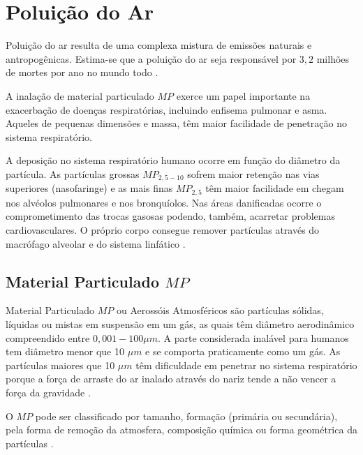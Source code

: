 \section{Poluição do Ar}

Poluição do ar resulta de uma complexa mistura de emissões naturais e 
antropogênicas. Estima-se que a poluição do ar seja responsável por 
$3,2$ milhões de mortes por ano no mundo todo \citep{lim2013}.%

A inalação de material particulado $MP$ exerce um papel importante na 
exacerbação de doenças respiratórias, incluindo enfisema pulmonar e asma. 
Aqueles de pequenas dimensões e massa, têm maior facilidade de penetração no sistema 
respiratório. 

A deposição no sistema respiratório humano ocorre em função do diâmetro da 
partícula.
As partículas grossas $MP_{2,5-10}$ sofrem maior retenção nas vias superiores (nasofaringe) e
as mais finas $MP_{2,5}$ têm maior facilidade em chegam nos alvéolos pulmonares e 
nos bronquíolos.
Nas áreas danificadas ocorre o comprometimento das trocas gasosas podendo, 
também, acarretar problemas cardiovasculares.
O próprio corpo consegue remover partículas através do macrófago alveolar 
e do sistema linfático \citep{arbex2012}.


\subsection{Material Particulado $MP$}

Material Particulado $MP$ ou Aerossóis Atmosféricos são partículas
sólidas, líquidas ou mistas em suspensão em um gás, as quais têm diâmetro 
aerodinâmico compreendido  entre $0,001-100\mu m$. 
A parte considerada inalável para humanos tem diâmetro menor que 10 $\mu m$
e se comporta praticamente como um gás.
As partículas maiores que 10 $\mu m$ têm dificuldade em penetrar 
no sistema respiratório porque a força de arraste do ar inalado através do nariz tende a não vencer a força da gravidade \citep{seinfeld1998}.%

O $MP$ pode ser classificado por tamanho, formação 
(primária ou secundária), pela forma de remoção da atmosfera, 
composição química ou forma geométrica da partículas \citep{seinfeld1998}.%

